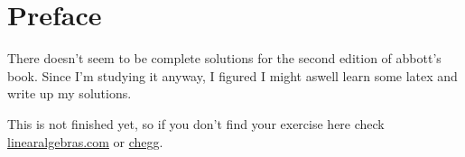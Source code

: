 \documentclass[titlepage]{book}
\begin{document}
\maketitle
\frontmatter

\chapter*{Preface}
There doesn't seem to be complete solutions for the second edition of abbott's book.
Since I'm studying it anyway, I figured I might aswell learn some latex and write up my solutions. \par
This is not finished yet, so if you don't find your exercise here check \href{https://linearalgebras.com/solution-understanding-analysis.html}{linearalgebras.com} or \href{https://www.chegg.com/homework-help/understanding-analysis-2nd-edition-solutions-9781493927111}{chegg}.

\tableofcontents
\mainmatter


\end{document}
